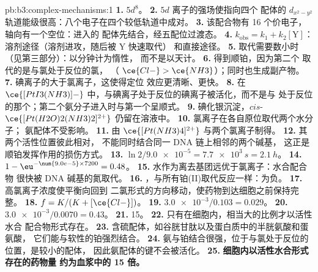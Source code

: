 \begin{solution}{pb:b3:complex-mechanisms:1}
\textbf{1.} $5d^8$。
\textbf{2.} $5d$ 离子的强场使指向四个
配体的 $d_{x^2-y^2}$ 轨道能级很高：八个电子在四个较低轨道中成对。
\textbf{3.} 该配合物有 16 个价电子，轴向有一个空位：进入的
配体先结合，经五配位过渡态。
\textbf{4.} $k_{\mathrm{obs}} = k_1 + k_2[\mathrm Y]$：溶剂途径（溶剂进攻，随后被 Y 快速取代）
和直接途径。
\textbf{5.} 取代需要数小时（见第三部分）：以分钟计为惰性，
而不是以天计。
\textbf{6.} 得到顺铂，因为第二个  取代的是与氯处于反位的氯，
（ $\ce{Cl-} > \ce{NH3}$）；同时也生成副产物。
\textbf{7.} 碘离子的大于氯离子，这使得定位
效应更清晰、更快。
\textbf{8.} 在 $\ce{[PtI3(NH3)]-}$ 中，与碘离子处于反位的碘离子被活化，而不是与
 处于反位的那个；第二个氨分子进入时与第一个呈顺式。
\textbf{9.} 碘化银沉淀，$cis$-$\ce{[Pt(H2O)2(NH3)2]^{2+}}$ 仍留在溶液中。
\textbf{10.} 氯离子在各自原位取代两个水分子；
氨配体不受影响。
\textbf{11.} 由 $\ce{[Pt(NH3)4]^{2+}}$ 与两个氯离子制得。
\textbf{12.} 其两个活性位置彼此相对，
不能同时结合同一 DNA 链上相邻的两个碱基，
这正是顺铂发挥作用的损伤方式。
\textbf{13.} $\ln2/\num{9.0e-5} = \qty{7.7e3}{s} = \qty{2.1}{h}$。
\textbf{14.} $1 - \eu^{-\num{9.0e-5} \times 7200} = 0.48$。
\textbf{15.} 水作为离去基团远优于氯离子：水合配合物
很快被 DNA 碱基的氮取代。
\textbf{16.} ，与所有铂(II)取代反应一样：为负。
\textbf{17.} 高氯离子浓度使平衡向回到
二氯形式的方向移动，使药物到达细胞之前保持完整。
\textbf{18.} $f = K/(K + [\ce{Cl-}])$。
\textbf{19.} $\num{3.0e-3}/0.103 = 0.029$。
\textbf{20.} $\num{3.0e-3}/0.0070 = 0.43$。
\textbf{21.} 15。
\textbf{22.} 只有在细胞内，相当大的比例才以活性水合
配合物形式存在。
\textbf{23.} 含硫配体，如谷胱甘肽以及蛋白质中的半胱氨酸和蛋氨酸，
它们能与软性的铂强烈结合。
\textbf{24.} 氨与铂结合很强，位于与氯处于反位的位置，是较小的配体，
因此氨配体的键不会被活化。
\textbf{25.} \textbf{细胞内以活性水合形式存在的药物量
约为血浆中的 15 倍。}
\end{solution}
